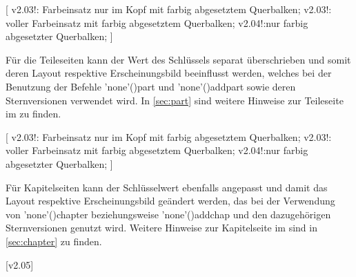 \begin{DeclareEntity*}{}
\begin{DeclareEntity*}{}
\begin{DeclareEntity*}{}
\begin{Declaration}
  {}
[%
  v2.03!:%
    Farbeinsatz nur im Kopf mit farbig abgesetztem Querbalken;
  v2.03!:%
    voller Farbeinsatz mit farbig abgesetztem Querbalken;
  v2.04!:nur farbig abgesetzter Querbalken;%
]
\printdeclarationlist[Teil|?]

Für die Teileseiten kann der Wert des Schlüssels  separat 
überschrieben und somit deren Layout respektive Erscheinungsbild beeinflusst 
werden, welches bei der Benutzung der Befehle 
\Macro'none'(){part} und 
\Macro'none'(){addpart} sowie deren Sternversionen 
verwendet wird. In \autoref{sec:part} sind weitere Hinweise zur Teileseite im 
\CD zu finden.
\end{Declaration}

\begin{Declaration}
  {}
[%
  v2.03!:%
    Farbeinsatz nur im Kopf mit farbig abgesetztem Querbalken;
  v2.03!:%
    voller Farbeinsatz mit farbig abgesetztem Querbalken;
  v2.04!:nur farbig abgesetzter Querbalken;%
]
\printdeclarationlist[Kapitel|?]

Für Kapitelseiten kann der Schlüsselwert  ebenfalls angepasst 
und damit das Layout respektive Erscheinungsbild geändert werden, das bei der 
Verwendung von \Macro'none'(){chapter} beziehungsweise 
\Macro'none'(){addchap} und den dazugehörigen 
Sternversionen genutzt wird. Weitere Hinweise zur Kapitelseite im \CD sind in 
\autoref{sec:chapter} zu finden.
\end{Declaration}

\begin{Declaration}
  {}
  [v2.05]
\printdeclarationlist


\end{Declaration}
\end{DeclareEntity*}
\end{DeclareEntity*}
\end{DeclareEntity*}
